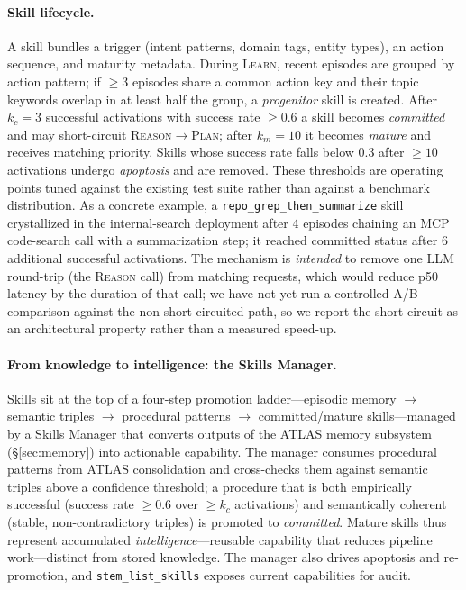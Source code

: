 \documentclass[11pt]{article}
\begin{document}
\paragraph{Skill lifecycle.} A skill bundles a trigger (intent patterns, domain tags, entity types), an action sequence, and maturity metadata. During \textsc{Learn}, recent episodes are grouped by action pattern; if $\geq 3$ episodes share a common action key and their topic keywords overlap in at least half the group, a \emph{progenitor} skill is created. After $k_c{=}3$ successful activations with success rate $\geq 0.6$ a skill becomes \emph{committed} and may short-circuit \textsc{Reason}$\to$\textsc{Plan}; after $k_m{=}10$ it becomes \emph{mature} and receives matching priority. Skills whose success rate falls below $0.3$ after $\geq 10$ activations undergo \emph{apoptosis} and are removed. These thresholds are operating points tuned against the existing test suite rather than against a benchmark distribution. As a concrete example, a \texttt{repo\_grep\_then\_summarize} skill crystallized in the internal-search deployment after 4 episodes chaining an MCP code-search call with a summarization step; it reached committed status after 6 additional successful activations. The mechanism is \emph{intended} to remove one LLM round-trip (the \textsc{Reason} call) from matching requests, which would reduce p50 latency by the duration of that call; we have not yet run a controlled A/B comparison against the non-short-circuited path, so we report the short-circuit as an architectural property rather than a measured speed-up.

\paragraph{From knowledge to intelligence: the Skills Manager.} Skills sit at the top of a four-step promotion ladder---episodic memory $\to$ semantic triples $\to$ procedural patterns $\to$ committed/mature skills---managed by a Skills Manager that converts outputs of the ATLAS memory subsystem (\S\ref{sec:memory}) into actionable capability. The manager consumes procedural patterns from ATLAS consolidation and cross-checks them against semantic triples above a confidence threshold; a procedure that is both empirically successful (success rate $\geq 0.6$ over $\geq k_c$ activations) and semantically coherent (stable, non-contradictory triples) is promoted to \emph{committed}. Mature skills thus represent accumulated \emph{intelligence}---reusable capability that reduces pipeline work---distinct from stored knowledge. The manager also drives apoptosis and re-promotion, and \texttt{stem\_list\_skills} exposes current capabilities for audit.
\end{document}
